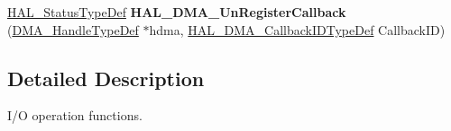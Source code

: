 \begin{DoxyCompactItemize}
\item 
\mbox{\label{group___d_m_a___exported___functions___group2_ga87842d3780f0e54c7fb29a003e6b5ac4}} 
\hyperlink{stm32f4xx__hal__def_8h_a63c0679d1cb8b8c684fbb0632743478f}{H\+A\+L\+\_\+\+Status\+Type\+Def} {\bfseries H\+A\+L\+\_\+\+D\+M\+A\+\_\+\+Un\+Register\+Callback} (\hyperlink{group___d_m_a___exported___types_ga41b754a906b86bce54dc79938970138b}{D\+M\+A\+\_\+\+Handle\+Type\+Def} $\ast$hdma, \hyperlink{group___d_m_a___exported___types_gafbe8b2bd9ce2128de6cdc08ccde7e8ad}{H\+A\+L\+\_\+\+D\+M\+A\+\_\+\+Callback\+I\+D\+Type\+Def} Callback\+ID)
\end{DoxyCompactItemize}


\subsection{Detailed Description}
I/O operation functions. 


